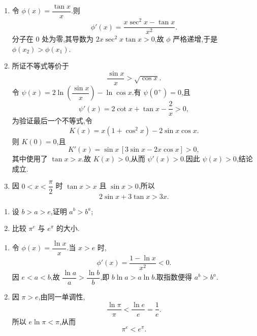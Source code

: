 \begin{solution}
    \begin{enumerate}
        \item 令 $\phi(x)=\dfrac{\tan x}{x}$.则
              \[
                  \phi'(x)=\dfrac{x\sec^2x-\tan x}{x^2}.
              \]
              分子在 $0$ 处为零,其导数为 $2x\sec^2x\tan x>0$,故 $\phi$ 严格递增,于是 $\phi(x_2)>\phi(x_1)$.

        \item 所证不等式等价于
              \[
                  \dfrac{\sin x}{x}>\sqrt{\cos x}.
              \]
              令 $\psi(x)=2\ln\left(\dfrac{\sin x}{x}\right)-\ln\cos x$.有 $\psi(0^+)=0$,且
              \[
                  \psi'(x)=2\cot x+\tan x-\dfrac{2}{x}>0,
              \]
              为验证最后一个不等式,令
              \[
                  K(x)=x(1+\cos^2x)-2\sin x\cos x.
              \]
              则 $K(0)=0$,且
              \[
                  K'(x)=\sin x\,[3\sin x-2x\cos x]>0,
              \]
              其中使用了 $\tan x>x$.故 $K(x)>0$,从而 $\psi'(x)>0$.因此 $\psi(x)>0$,结论成立.

        \item 因 $0<x<\dfrac{\pi}{2}$ 时 $\tan x>x$ 且 $\sin x>0$,所以
              \[
                  2\sin x+3\tan x>3x.
              \]
    \end{enumerate}
\end{solution}

\begin{example}
    \begin{enumerate}
        \item 设 $b>a>e$,证明 $a^b>b^a$;
        \item 比较 $\pi^e$ 与 $e^\pi$ 的大小.
    \end{enumerate}
\end{example}
\exampleblank

\begin{solution}
    \begin{enumerate}
        \item 令 $\phi(x)=\dfrac{\ln x}{x}$.当 $x>e$ 时,
              \[
                  \phi'(x)=\dfrac{1-\ln x}{x^2}<0.
              \]
              因 $e<a<b$,故 $\dfrac{\ln a}{a}>\dfrac{\ln b}{b}$,即 $b\ln a>a\ln b$.取指数便得 $a^b>b^a$.

        \item 因 $\pi>e$,由同一单调性,
              \[
                  \dfrac{\ln\pi}{\pi}<\dfrac{\ln e}{e}=\dfrac{1}{e}.
              \]
              所以 $e\ln\pi<\pi$,从而
              \[
                  \boxed{\pi^e<e^\pi}.
              \]
    \end{enumerate}
\end{solution}



